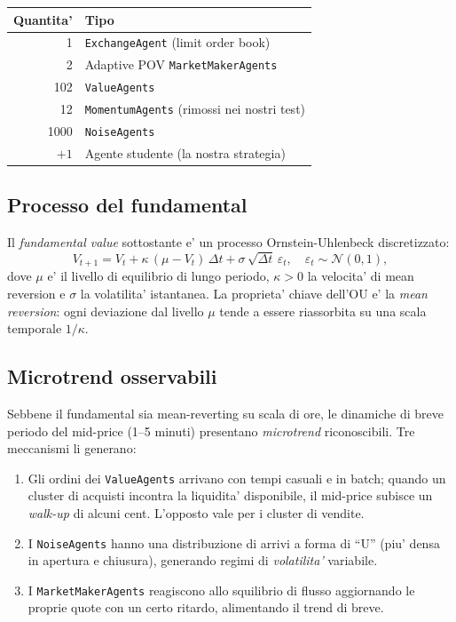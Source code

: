 \documentclass[11pt,a4paper]{article}
\begin{document}
\begin{center}
\begin{tabular}{rl}
\toprule
\textbf{Quantita'} & \textbf{Tipo} \\
\midrule
1     & \texttt{ExchangeAgent} (limit order book) \\
2     & Adaptive POV \texttt{MarketMakerAgents} \\
102   & \texttt{ValueAgents} \\
12    & \texttt{MomentumAgents} (rimossi nei nostri test) \\
1000  & \texttt{NoiseAgents} \\
\midrule
$+1$  & Agente studente (la nostra strategia) \\
\bottomrule
\end{tabular}
\end{center}

\subsection{Processo del fundamental}

Il \emph{fundamental value} sottostante e' un processo
Ornstein-Uhlenbeck discretizzato:
\begin{equation}
    V_{t+1} = V_t + \kappa\,(\mu - V_t)\,\Delta t + \sigma\,\sqrt{\Delta t}\,\varepsilon_t,
    \quad \varepsilon_t \sim \mathcal{N}(0, 1),
    \label{eq:ou}
\end{equation}
dove $\mu$ e' il livello di equilibrio di lungo periodo, $\kappa>0$
la velocita' di mean reversion e $\sigma$ la volatilita' istantanea.
La proprieta' chiave dell'OU e' la \emph{mean reversion}: ogni
deviazione dal livello $\mu$ tende a essere riassorbita su una scala
temporale $1/\kappa$.

\subsection{Microtrend osservabili}

Sebbene il fundamental sia mean-reverting su scala di ore, le
dinamiche di breve periodo del mid-price (1--5 minuti) presentano
\emph{microtrend} riconoscibili.  Tre meccanismi li generano:
\begin{enumerate}
    \item Gli ordini dei \texttt{ValueAgents} arrivano con tempi
          casuali e in batch; quando un cluster di acquisti incontra
          la liquidita' disponibile, il mid-price subisce un
          \emph{walk-up} di alcuni cent.  L'opposto vale per i
          cluster di vendite.
    \item I \texttt{NoiseAgents} hanno una distribuzione di arrivi
          a forma di ``U'' (piu' densa in apertura e chiusura),
          generando regimi di \emph{volatilita'} variabile.
    \item I \texttt{MarketMakerAgents} reagiscono allo squilibrio di
          flusso aggiornando le proprie quote con un certo ritardo,
          alimentando il trend di breve.
\end{enumerate}
\end{document}

